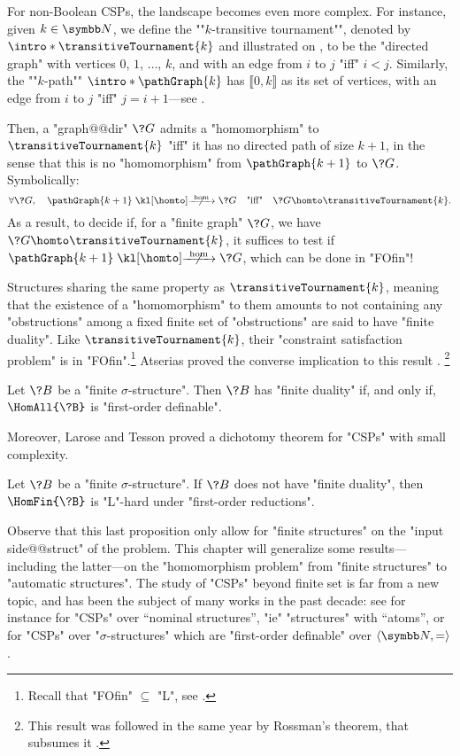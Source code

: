 For non-Boolean CSPs, the landscape becomes even more complex.
For instance, given $k\in\N$, we define the \AP""$k$-transitive tournament"", denoted
by \AP$\intro*\transitiveTournament{k}$ and illustrated on ,
to be the "directed graph" with vertices $0$, $1$, $\dotsc$, $k$,
and with an edge from $i$ to $j$ "iff" $i < j$.
Similarly, the \AP""$k$-path"" \AP$\intro*\pathGraph{k}$ has $\lBrack 0,k\rBrack$ as
its set of vertices, with an edge from $i$ to $j$ "iff" $j = i + 1$---see .

Then, a "graph@@dir" $\?G$ admits a "homomorphism" to $\transitiveTournament{k}$ "iff"
it has no directed path of size $k+1$, in the sense that this is no "homomorphism"
from $\pathGraph{k+1}$ to $\?G$. Symbolically:
\[
	\forall \?G,\quad
	\pathGraph{k+1} \nothomto \?G
	\quad\text{"iff"}\quad
	\?G \homto \transitiveTournament{k}.
\]
As a result, to decide if, for a "finite graph" $\?G$, we have
$\?G \homto \transitiveTournament{k}$, it suffices
to test if $\pathGraph{k+1} \nothomto \?G$, which can be done in "FOfin"!

Structures sharing the same property as $\transitiveTournament{k}$, meaning that
the existence of a "homomorphism" to them amounts to not containing any "obstructions"
among a fixed finite set of "obstructions" are said to have "finite duality".
Like $\transitiveTournament{k}$, their "constraint satisfaction problem"
is in "FOfin".\footnote{Recall that "FOfin" $\subseteq$ "L", see .}
Atserias proved the converse implication to this result \cite[Corollary 4]{Atserias2008DigraphColoring}.%
\footnote{This result was followed in the same year
by Rossman's theorem, that subsumes it \cite[Theorem~1.3]{Rossman2008Homomorphism}.}

\begin{proposition}
	\AP Let $\?B$ be a "finite $\sigma$-structure". Then $\?B$ has "finite duality"
	if, and only if, $\HomAll{\?B}$ is "first-order definable".
\end{proposition}

Moreover, Larose and Tesson proved a dichotomy theorem for "CSPs" with small complexity.
\begin{proposition}
	Let $\?B$ be a "finite $\sigma$-structure". If $\?B$ does not have "finite duality",
	then $\HomFin{\?B}$ is "L"-hard under "first-order reductions".
\end{proposition}

Observe that this last proposition only allow for "finite structures" on the
"input side@@struct" of the problem.
This chapter will generalize some results---including the latter---on the "homomorphism problem"
from "finite structures" to "automatic structures". The study of "CSPs" beyond finite set
is far from a new topic, and has been the subject of many works in the past decade:
see for instance \cite{KlinKopczynskiOchremiakTorunczyk2015LocallyFiniteCSP} for "CSPs"
over ``nominal structures'', "ie" "structures" with ``atoms'',
or \cite{KlinLasotaOchremiakTorunczyk2016HomomorphismProblems} for "CSPs" over
"$\sigma$-structures" which are "first-order definable" over $\tup{\N,{=}}$.


